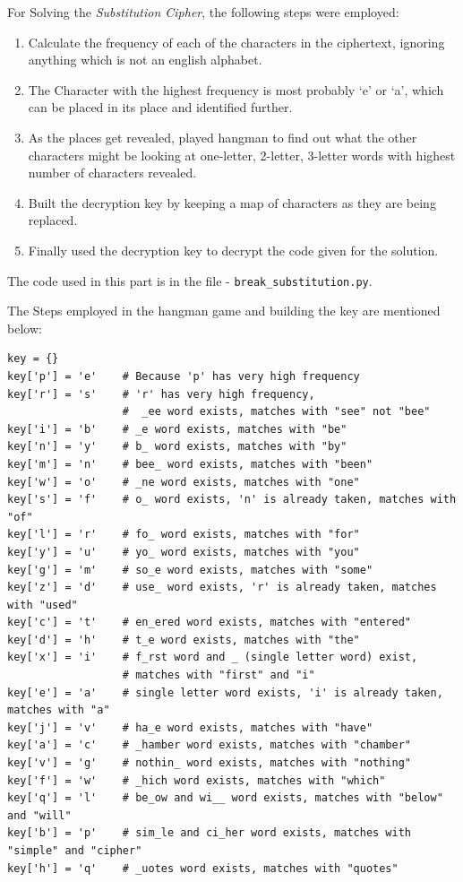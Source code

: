\documentclass[10pt,twoside]{article}
\begin{document}
For Solving the \textit{Substitution Cipher}, the following steps were employed:
\begin{enumerate}
  \setlength\itemsep{0em}
    \item Calculate the frequency of each of the characters in the ciphertext, ignoring anything which is not an english alphabet.
    \item The Character with the highest frequency is most probably `e' or `a', which can be placed in its place and identified further.
    \item As the places get revealed, played hangman to find out what the other characters might be looking at one-letter, 2-letter, 3-letter words with highest number of characters revealed.
    \item Built the decryption key by keeping a map of characters as they are being replaced.
    \item Finally used the decryption key to decrypt the code given for the solution.
\end{enumerate}

The code used in this part is in the file - \texttt{break\_substitution.py}. \newline

The Steps employed in the hangman game and building the key are mentioned below:
\begin{verbatim}
key = {}
key['p'] = 'e'    # Because 'p' has very high frequency
key['r'] = 's'    # 'r' has very high frequency,
                  #  _ee word exists, matches with "see" not "bee"
key['i'] = 'b'    # _e word exists, matches with "be"
key['n'] = 'y'    # b_ word exists, matches with "by"
key['m'] = 'n'    # bee_ word exists, matches with "been"
key['w'] = 'o'    # _ne word exists, matches with "one"
key['s'] = 'f'    # o_ word exists, 'n' is already taken, matches with "of"
key['l'] = 'r'    # fo_ word exists, matches with "for"
key['y'] = 'u'    # yo_ word exists, matches with "you"
key['g'] = 'm'    # so_e word exists, matches with "some"
key['z'] = 'd'    # use_ word exists, 'r' is already taken, matches with "used"
key['c'] = 't'    # en_ered word exists, matches with "entered"
key['d'] = 'h'    # t_e word exists, matches with "the"
key['x'] = 'i'    # f_rst word and _ (single letter word) exist,
                  # matches with "first" and "i"
key['e'] = 'a'    # single letter word exists, 'i' is already taken, matches with "a"
key['j'] = 'v'    # ha_e word exists, matches with "have"
key['a'] = 'c'    # _hamber word exists, matches with "chamber"
key['v'] = 'g'    # nothin_ word exists, matches with "nothing"
key['f'] = 'w'    # _hich word exists, matches with "which"
key['q'] = 'l'    # be_ow and wi__ word exists, matches with "below" and "will"
key['b'] = 'p'    # sim_le and ci_her word exists, matches with "simple" and "cipher"
key['h'] = 'q'    # _uotes word exists, matches with "quotes"
\end{verbatim}
\end{document}
